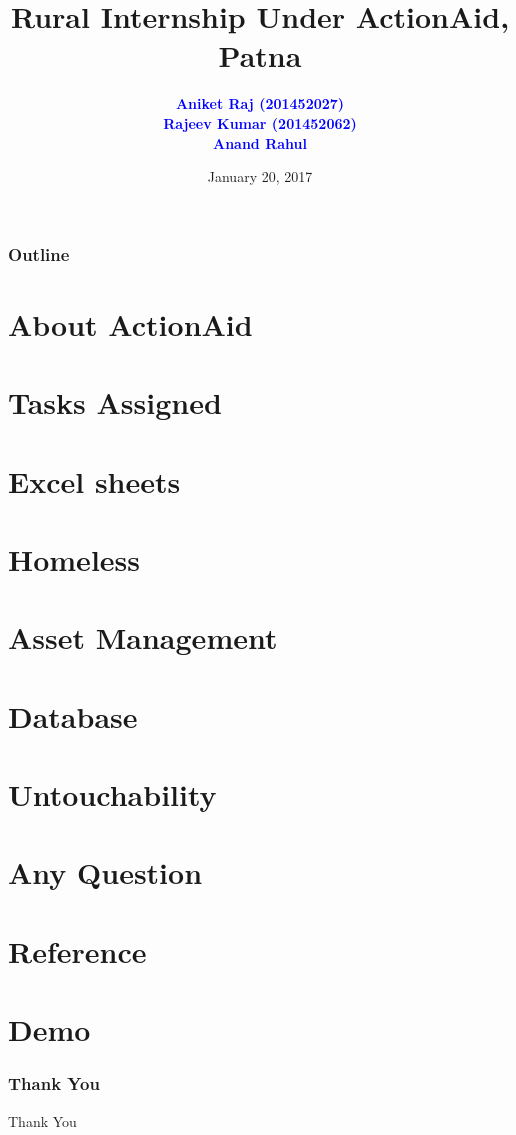 \documentclass[handout]{beamer}
\title[Topic\hspace{2.0cm} \insertframenumber/\inserttotalframenumber]{Rural Internship Under ActionAid, Patna}
\author[Rajeev Kumar Singh (IIIT-V) %
]{ %
\textbf{\textcolor{blue}{Aniket Raj (201452027)}}
\textbf{\textcolor{blue}{\\Rajeev Kumar (201452062)}}
\textbf{\textcolor{blue}{ \\ Anand Rahul}}
}
\date{January 20, 2017}
\begin{document}
\begin{frame}
	\titlepage
\end{frame}

\begin{frame}%
	\frametitle{Outline}
	\framesubtitle{}
	\tableofcontents
\end{frame}


\section[About ActionAid]{About ActionAid}


\section[Tasks Assigned]{Tasks Assigned}



\section[Excel sheets]{Excel sheets}


\section[Homeless]{Homeless}


\section[Asset Management]{Asset Management}


\section[Database]{Database}


\section[Untouchability]{Untouchability}



\section[Any Question]{Any Question}


\section[Reference]{Reference}





\section[Demo]{Demo}



\begin{frame}
\frametitle{Thank You}
\begin{center}
\Huge Thank You

\end{center}

\end{frame}
\end{document}
